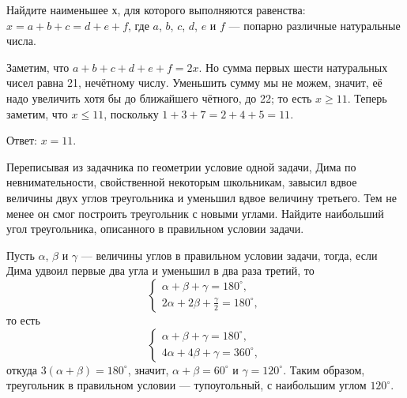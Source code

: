 
\begin{itemize}
\itC Найдите наименьшее $х$, для которого выполняются равенства:
$x = a+b+c = d+e+f$, где $a$, $b$, $c$, $d$, $e$ и $f$ --- попарно различные натуральные числа.

\itr Заметим, что $a+b+c+d+e+f=2x$. Но сумма первых шести натуральных чисел равна 21, нечётному числу.
Уменьшить сумму мы не можем, значит, её надо увеличить хотя бы до ближайшего чётного, до 22;
то есть $x \ge 11$. Теперь заметим, что $x \le 11$, поскольку
$1 + 3 +7 = 2 + 4 + 5 = 11$.

Ответ: $x=11$.
\end{itemize}

\begin{itemize}
\itB Переписывая из задачника по геометрии условие одной задачи, Дима по невнимательности, 
свойственной некоторым школьникам, завысил вдвое величины двух углов треугольника и уменьшил 
вдвое величину третьего. Тем не менее он смог построить треугольник с новыми углами. Найдите 
наибольший угол треугольника, описанного в правильном условии задачи.

\itr
 Пусть $\alpha$, $\beta$ и $\gamma$ --- величины углов в правильном условии задачи, тогда, если 
Дима удвоил первые два угла и уменьшил в два раза третий, то
$$
\begin{cases}
\alpha+\beta+\gamma=180^{\circ},\\
2\alpha+2\beta+\frac{\gamma}{2}=180^{\circ},
\end{cases}
$$
то есть
$$
\begin{cases}
\alpha+\beta+\gamma=180^{\circ},\\
4\alpha+4\beta+\gamma=360^{\circ},
\end{cases}
$$
откуда $3(\alpha+\beta)=180^{\circ}$, значит, $\alpha+\beta=60^\circ$ и $\gamma=120^{\circ}$.
Таким образом, треугольник в правильном условии — тупоугольный, с наибольшим углом 
$120^{\circ}$.

\end{itemize}
